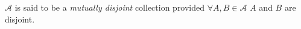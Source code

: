 \guard




\begin{defn}
\label{defn:mutuallyDisjointCollection}
  $\mathcal{A}$ is said to be a \emph{mutually disjoint} collection provided $\forall A,B\in\mathcal{A}$ $A$ and $B$ are disjoint.
\end{defn}
